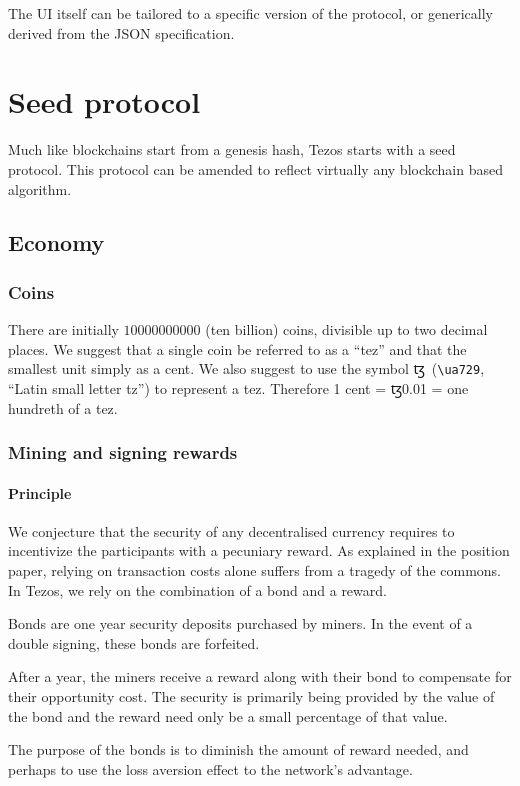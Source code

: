 \documentclass[letterpaper]{article}
\newcommand{\tz}{{\fontspec{DejaVu Sans} \small{ꜩ}}}
\begin{document}
The UI itself can be tailored to a specific version of the protocol, or generically
derived from the JSON specification.

\section{Seed protocol}
Much like blockchains start from a genesis hash, Tezos starts with a seed
protocol. This protocol can be amended to reflect virtually any blockchain based
algorithm.

\subsection{Economy}

\subsubsection{Coins}
There are initially $\num{10000000000}$ (ten billion) coins, divisible up to two
decimal places. We suggest that a single coin be referred to as a ``tez''
and that the smallest unit simply as a cent. We also suggest to use the
symbol \tz~(\verb!\ua729!, ``Latin small letter tz'') to represent a tez.
Therefore 1 cent = \tz\num{0.01} = one hundreth of a tez.

\subsubsection{Mining and signing rewards}

\paragraph{Principle}
We conjecture that the security of any decentralised currency requires
to incentivize the participants with a pecuniary reward. As explained in the
position paper, relying on transaction costs alone suffers from a tragedy of the
commons. In Tezos, we rely on the combination of a bond and a reward.

Bonds are one year security deposits purchased by miners.
In the event of a double signing, these bonds are forfeited.

After a year, the miners  receive a reward along with their bond to compensate
for their opportunity cost. The security is primarily being provided by the
value of the bond and the reward need only be a small percentage of that value.

The purpose of the bonds is to diminish the amount of reward needed, and perhaps
to use the loss aversion effect to the network's advantage.
\end{document}
